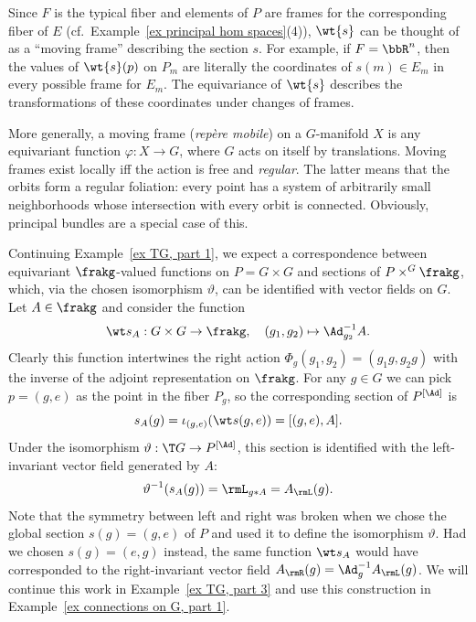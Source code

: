\begin{rem}
    Since $F$ is the typical fiber and elements of $P$ are frames for the corresponding fiber of $E$ (cf.\ Example~\ref{ex principal hom spaces}(4)), $\wt{s}$ can be thought of as a ``moving frame'' describing the section $s$. For example, if $F=\bbR^n$, then the values of $\wt{s}(p)$ on $P_m$ are literally the coordinates of $s(m)\in E_m$ in every possible frame for $E_m$. The equivariance of $\wt{s}$ describes the transformations of these coordinates under changes of frames.

    More generally, a moving frame (\emph{rep\`ere mobile})  on a $G$-manifold $X$ is any equivariant function $\varphi:X\to G$, where $G$ acts on itself by translations. Moving frames exist locally iff the action is free and \emph{regular}. The latter means that the orbits form a regular foliation: every point has a system of arbitrarily small neighborhoods whose intersection with every orbit is connected. Obviously, principal bundles are a special case of this.
\end{rem}

\begin{example}\label{ex TG, part 2}
    Continuing Example~\ref{ex TG, part 1}, we expect a correspondence between equivariant $\frakg$-valued functions on $P=G\times G$ and sections of $P\times^G \frakg$, which, via the chosen isomorphism $\vartheta$, can be identified with vector fields on $G$. Let $A\in\frakg$ and consider the function
    \[\wt s_A:G\times G\to \frakg,\quad (g_1,g_2)\mapsto \Ad_{g_2}^{-1}A.\]
    Clearly this function intertwines the right action $\Phi_g(g_1,g_2)=(g_1g,g_2g)$ with the inverse of the adjoint representation on $\frakg$. For any $g\in G$ we can pick $p=(g,e)$ as the point in the fiber $P_g$, so the corresponding section of $P^{[\Ad]}$ is 
    \[s_A(g)=\iota_{(g,e)}(\wt s(g,e))=[(g,e),A].\]
    Under the isomorphism $\vartheta:\T G\to P^{[\Ad]}$, this section is identified with the left-invariant vector field generated by $A$:
    \[\vartheta^{-1}(s_A(g))=\rmL_{g\ast A}=A_\rmL(g).\]
    Note that the symmetry between left and right was broken when we chose the global section $s(g)=(g,e)$ of $P$ and used it to define the isomorphism $\vartheta$. Had we chosen $s(g)=(e,g)$ instead, the same function $\wt s_A$ would have corresponded to the right-invariant vector field $A_\rmR(g)=\Ad_g^{-1} A_\rmL(g)$. We will continue this work in Example~\ref{ex TG, part 3} and use this construction in Example~\ref{ex connections on G, part 1}.
\end{example}





